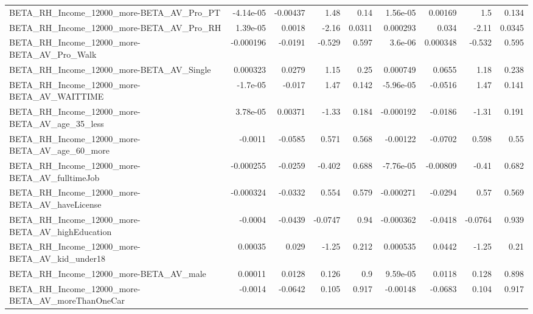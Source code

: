 \begin{tabular}{lrrrrrrrr}
BETA\_RH\_Income\_12000\_more-BETA\_AV\_Pro\_PT           &   -4.14e-05 &     -0.00437 &     1.48 &     0.14 &   1.56e-05 &     0.00169 &          1.5 &         0.134 \\
BETA\_RH\_Income\_12000\_more-BETA\_AV\_Pro\_RH           &    1.39e-05 &       0.0018 &    -2.16 &   0.0311 &   0.000293 &       0.034 &        -2.11 &        0.0345 \\
BETA\_RH\_Income\_12000\_more-BETA\_AV\_Pro\_Walk         &   -0.000196 &      -0.0191 &   -0.529 &    0.597 &    3.6e-06 &    0.000348 &       -0.532 &         0.595 \\
BETA\_RH\_Income\_12000\_more-BETA\_AV\_Single           &    0.000323 &       0.0279 &     1.15 &     0.25 &   0.000749 &      0.0655 &         1.18 &         0.238 \\
BETA\_RH\_Income\_12000\_more-BETA\_AV\_WAITTIME         &    -1.7e-05 &       -0.017 &     1.47 &    0.142 &  -5.96e-05 &     -0.0516 &         1.47 &         0.141 \\
BETA\_RH\_Income\_12000\_more-BETA\_AV\_age\_35\_less      &    3.78e-05 &      0.00371 &    -1.33 &    0.184 &  -0.000192 &     -0.0186 &        -1.31 &         0.191 \\
BETA\_RH\_Income\_12000\_more-BETA\_AV\_age\_60\_more      &     -0.0011 &      -0.0585 &    0.571 &    0.568 &   -0.00122 &     -0.0702 &        0.598 &          0.55 \\
BETA\_RH\_Income\_12000\_more-BETA\_AV\_fulltimeJob      &   -0.000255 &      -0.0259 &   -0.402 &    0.688 &  -7.76e-05 &    -0.00809 &        -0.41 &         0.682 \\
BETA\_RH\_Income\_12000\_more-BETA\_AV\_haveLicense      &   -0.000324 &      -0.0332 &    0.554 &    0.579 &  -0.000271 &     -0.0294 &         0.57 &         0.569 \\
BETA\_RH\_Income\_12000\_more-BETA\_AV\_highEducation    &     -0.0004 &      -0.0439 &  -0.0747 &     0.94 &  -0.000362 &     -0.0418 &      -0.0764 &         0.939 \\
BETA\_RH\_Income\_12000\_more-BETA\_AV\_kid\_under18      &     0.00035 &        0.029 &    -1.25 &    0.212 &   0.000535 &      0.0442 &        -1.25 &          0.21 \\
BETA\_RH\_Income\_12000\_more-BETA\_AV\_male             &     0.00011 &       0.0128 &    0.126 &      0.9 &   9.59e-05 &      0.0118 &        0.128 &         0.898 \\
BETA\_RH\_Income\_12000\_more-BETA\_AV\_moreThanOneCar   &     -0.0014 &      -0.0642 &    0.105 &    0.917 &   -0.00148 &     -0.0683 &        0.104 &         0.917 \\

\end{tabular}
